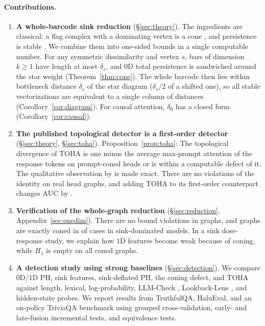 \documentclass{article}
\theoremstyle{definition}
\newcommand{\defect}{\delta}
\begin{document}
\paragraph{Contributions.}
\begin{enumerate}[leftmargin=*]
\item \textbf{A whole-barcode sink reduction} (\S\ref{sec:theory}). The ingredients are classical: a flag complex with a dominating vertex is a cone \citep{barmak2012strong,boissonnat2020edge}, and persistence is stable \citep{cohensteiner2007stability,chazal2009proximity,chazal2014geometric}. We combine them into one-sided bounds in a single computable number. For any symmetric dissimilarity and vertex $s$, bars of dimension $k\ge1$ have length at most $\defect_s$, and $0$D total persistence is sandwiched around the star weight (Theorem~\ref{thm:cone}). The whole barcode then lies within bottleneck distance $\defect_s$ of the star diagram ($\defect_s/2$ of a shifted one), so all stable vectorizations are equivalent to a single column of distances (Corollary~\ref{cor:diagram}). For causal attention, $\defect_0$ has a closed form (Corollary~\ref{cor:causal}).
\item \textbf{The published topological detector is a first-order detector} (\S\ref{sec:theory}, \S\ref{sec:toha}). Proposition~\ref{prop:toha}: The topological divergence of TOHA is one minus the average max-prompt attention of the response tokens on prompt-coned heads or is within a computable defect of it. The qualitative observation by \citet{binkowski2026sinkprobe} is made exact. There are no violations of the identity on \TohaCells{} real head graphs, and adding TOHA to its first-order counterpart changes AUC by \TohaLFMaxpRange{}.
\item \textbf{Verification of the whole-graph reduction} (\S\ref{sec:reduction}, Appendix~\ref{sec:onedim}). There are no bound violations in \NCellsTotal{} graphs, and graphs are exactly coned in \PctConedRange{} of cases in sink-dominated models. In a sink dose-response study, we explain how $1$D features become weak because of coning, while $H_1$ is empty on all coned graphs.
\item \textbf{A detection study using strong baselines} (\S\ref{sec:detection}). We compare $0$D/$1$D PH, sink features, sink-deflated PH, the coning defect, and TOHA against length, lexical, log-probability, LLM-Check \citep{sriramanan2024llmcheck}, Lookback-Lens \citep{chuang2024lookback}, and hidden-state probes. We report results from TruthfulQA, HaluEval, and an on-policy TriviaQA benchmark using grouped cross-validation, early- and late-fusion incremental tests, and equivalence tests.
\end{enumerate}
\end{document}
